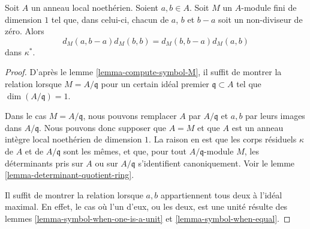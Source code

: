 \begin{lemma}
\label{lemma-symbol-is-steinberg-prepare}
Soit $A$ un anneau local noethérien.
Soient $a, b \in A$.
Soit $M$ un $A$-module fini de dimension $1$ tel que, dans celui-ci,
chacun de $a$, $b$ et $b - a$ soit un non-diviseur de zéro.
Alors
$$
d_M(a, b - a)d_M(b, b) = d_M(b, b - a)d_M(a, b)
$$
dans $\kappa^*$.
\end{lemma}

\begin{proof}
D'après le lemme \ref{lemma-compute-symbol-M}, il suffit de montrer la relation lorsque
$M = A/\mathfrak q$ pour un certain idéal premier $\mathfrak q \subset A$ tel que
$\dim(A/\mathfrak q) = 1$.

\medskip\noindent
Dans le cas $M = A/\mathfrak q$, nous pouvons remplacer $A$ par $A/\mathfrak q$ et
$a, b$ par leurs images dans $A/\mathfrak q$. Nous pouvons donc supposer que $A = M$
et que $A$ est un anneau intègre local noethérien de dimension $1$. La raison en est
que les corps résiduels $\kappa$ de $A$ et de $A/\mathfrak q$ sont
les mêmes, et que, pour tout $A/\mathfrak q$-module $M$, les déterminants
pris sur $A$ ou sur $A/\mathfrak q$ s'identifient canoniquement.
Voir le lemme \ref{lemma-determinant-quotient-ring}.

\medskip\noindent
Il suffit de montrer la relation lorsque
$a, b$ appartiennent tous deux à l'idéal maximal. En effet, le cas où l'un
d'eux, ou les deux, est une unité résulte des lemmes \ref{lemma-symbol-when-one-is-a-unit}
et \ref{lemma-symbol-when-equal}.


\end{proof}
